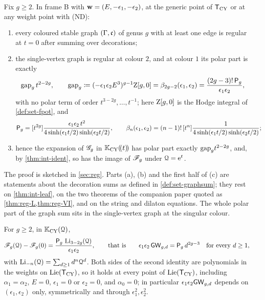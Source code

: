 \begin{thm}
\label{thm:int-reg}
Fix $g\geq2$. In frame B with $\mathbf{w}=(E,-\epsilon_1,-\epsilon_2)$, at the generic point of $\mathsf{T}_{\mathrm{CY}}$ or at any weight point with (ND):
\begin{enumerate}
\item[(a)] every coloured stable graph $(\Gamma,\mathfrak{c})$ of genus $g$ with at least one edge is regular at $t=0$ after summing over decorations;
\item[(b)] the single-vertex graph is regular at colour $2$, and at colour $1$ its polar part is exactly
\[
\mathrm{gap}_g\,t^{2-2g},\qquad \mathrm{gap}_g\coloneqq(-\epsilon_1\epsilon_2E^3)^{g-1}\mathrm{Z}[g,0]=\beta_{2g-2}(\epsilon_1,\epsilon_2)=\frac{(2g-3)!\,\mathsf{P}_{g}}{\epsilon_1\epsilon_2},
\]
with no polar term of order $t^{3-2g},\dots,t^{-1}$; here $\mathrm{Z}[g,0]$ is the Hodge integral of \cref{def:set-fpot}, and
\[
\mathsf{P}_{g}=[t^{2g}]\frac{\epsilon_1\epsilon_2\,t^2}{4\sinh(\epsilon_1t/2)\sinh(\epsilon_2t/2)},\qquad
\beta_n(\epsilon_1,\epsilon_2)=(n-1)!\,[t^n]\frac{1}{4\sinh(\epsilon_1t/2)\sinh(\epsilon_2t/2)} ;
\]
\item[(c)] hence the expansion of $\mathscr{G}_g$ in $\mathbb{K}_{\mathrm{CY}}(\!(t)\!)$ has polar part exactly $\mathrm{gap}_g t^{2-2g}$, and, by \cref{thm:int-ident}, so has the image of $\mathscr{F}_g$ under $\mathcal{Q}=\mathrm{e}^t$.
\end{enumerate}
\end{thm}

The proof is sketched in \cref{sec:reg}. Parts (a), (b) and the first half of (c) are statements about the decoration sums as defined in \cref{def:set-graphsum}; they rest on \cref{thm:int-leaf}, on the two theorems of the companion paper \cite{LP2} quoted as \cref{thm:reg-L,thm:reg-VI}, and on the string and dilaton equations. The whole polar part of the graph sum sits in the single-vertex graph at the singular colour.

\begin{thm}
\label{thm:int-rig}
For $g\geq2$, in $\mathbb{K}_{\mathrm{CY}}(\mathcal{Q})$,
\[
\mathscr{F}_g(\mathcal{Q})-\mathscr{F}_g(0)=\frac{\mathsf{P}_{g}\,\operatorname{Li}_{3-2g}(\mathcal{Q})}{\epsilon_1\epsilon_2},\qquad\text{that is}\qquad \epsilon_1\epsilon_2\,\mathsf{GW}_{g,d}=\mathsf{P}_{g}\,d^{2g-3}\quad\text{for every }d\geq1,
\]
with $\operatorname{Li}_{-n}(\mathcal{Q})=\sum_{d\geq1}d^n\mathcal{Q}^d$. Both sides of the second identity are polynomials in the weights on $\mathrm{Lie}(\mathsf{T}_{\mathrm{CY}})$, so it holds at every point of $\mathrm{Lie}(\mathsf{T}_{\mathrm{CY}})$, including $\alpha_1=\alpha_2$, $E=0$, $\epsilon_1=0$ or $\epsilon_2=0$, and $\alpha_0=0$; in particular $\epsilon_1\epsilon_2\mathsf{GW}_{g,d}$ depends on $(\epsilon_1,\epsilon_2)$ only, symmetrically and through $\epsilon_1^2,\epsilon_2^2$.
\end{thm}

